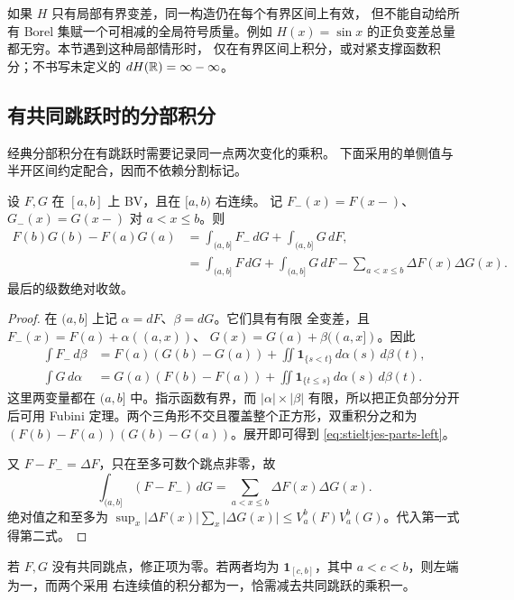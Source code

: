 如果 \(H\) 只有局部有界变差，同一构造仍在每个有界区间上有效，
但不能自动给所有 Borel 集赋一个可相减的全局符号质量。例如
\(H(x)=\sin x\) 的正负变差总量都无穷。本节遇到这种局部情形时，
仅在有界区间上积分，或对紧支撑函数积分；不书写未定义的
\(dH(\mathbb{R})=\infty-\infty\)。

\subsection{有共同跳跃时的分部积分}

经典分部积分在有跳跃时需要记录同一点两次变化的乘积。
下面采用的单侧值与半开区间约定配合，因而不依赖分割标记。

\begin{theorem}\label{thm:stieltjes-integration-by-parts}
设 \(F,G\) 在 \([a,b]\) 上 BV，且在 \([a,b)\) 右连续。
记 \(F_-(x)=F(x-)\)、\(G_-(x)=G(x-)\) 对 \(a<x\le b\)。则
\begin{align}
 F(b)G(b)-F(a)G(a)
 &=\int_{(a,b]}F_-\,dG+\int_{(a,b]}G\,dF,
 \label{eq:stieltjes-parts-left}\\
 &=\int_{(a,b]}F\,dG+\int_{(a,b]}G\,dF
   -\sum_{a<x\le b}\Delta F(x)\Delta G(x).
 \label{eq:stieltjes-parts-jumps}
\end{align}
最后的级数绝对收敛。
\end{theorem}
\begin{proof}
在 \((a,b]\) 上记 \(\alpha=dF\)、\(\beta=dG\)。它们具有有限
全变差，且
\(F_-(x)=F(a)+\alpha((a,x))\)、
\(G(x)=G(a)+\beta((a,x])\)。因此
\[
 \begin{aligned}
 \int F_-\,d\beta
 &=F(a)(G(b)-G(a))
   +\iint\mathbf1_{\{s<t\}}\,d\alpha(s)\,d\beta(t),\\
 \int G\,d\alpha
 &=G(a)(F(b)-F(a))
   +\iint\mathbf1_{\{t\le s\}}\,d\alpha(s)\,d\beta(t).
 \end{aligned}
\]
这里两变量都在 \((a,b]\) 中。指示函数有界，而
\(|\alpha|\times|\beta|\) 有限，所以把正负部分分开后可用 Fubini
定理。两个三角形不交且覆盖整个正方形，双重积分之和为
\((F(b)-F(a))(G(b)-G(a))\)。展开即可得到
\eqref{eq:stieltjes-parts-left}。

又 \(F-F_-=\Delta F\)，只在至多可数个跳点非零，故
\[
 \int_{(a,b]}(F-F_-)\,dG
 =\sum_{a<x\le b}\Delta F(x)\Delta G(x).
\]
绝对值之和至多为
\(\sup_x|\Delta F(x)|\sum_x|\Delta G(x)|
 \le V_a^b(F)V_a^b(G)\)。代入第一式得第二式。
\end{proof}

若 \(F,G\) 没有共同跳点，修正项为零。若两者均为
\(\mathbf1_{[c,b]}\)，其中 \(a<c<b\)，则左端为一，而两个采用
右连续值的积分都为一，恰需减去共同跳跃的乘积一。

